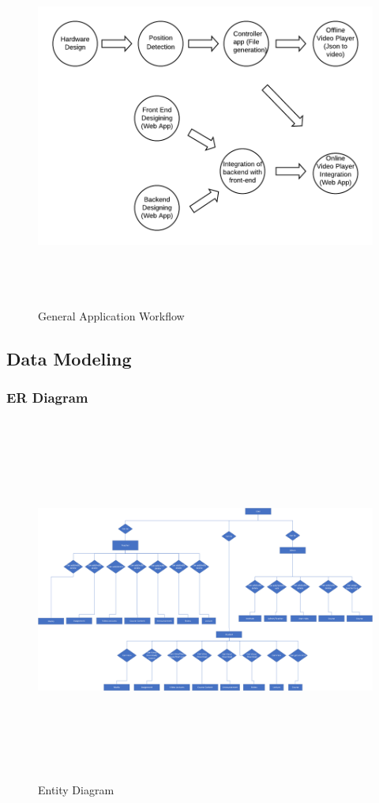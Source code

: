 \documentclass[12pt]{article}
\begin{document}
\begin{figure}[h]
\begin{center}
\includegraphics[width=13cm, height=12cm]{ActivityDiagram}
\caption{General Application Workflow}
\end{center}
\end{figure}

\newpage
\subsection{Data Modeling}
\subsubsection{ER Diagram}
\begin{figure}[h]
\begin{center}
\includegraphics[width=12cm, height=12cm]{EntityDiagram}
\caption{Entity Diagram}
\end{center}
\end{figure}
\end{document}

